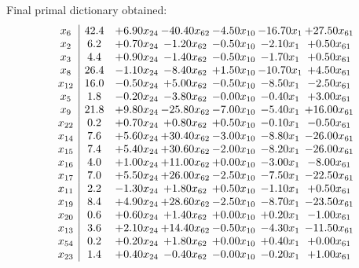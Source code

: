 \documentclass[8pt]{article}
\begin{document}
 Final primal dictionary obtained: 
\[\begin{array}{c| c c@{\hskip 2pt} c@{\hskip 2pt} c@{\hskip 2pt} c@{\hskip 2pt} c@{\hskip 2pt} }
 x_{6}   &  42.4 & +  6.90 x_{24} & -40.40 x_{62} & -4.50 x_{10} & -16.70 x_{1} & + 27.50 x_{61}\\
 x_{2}   &  6.2 & +  0.70 x_{24} & -1.20 x_{62} & -0.50 x_{10} & -2.10 x_{1} & +  0.50 x_{61}\\
 x_{3}   &  4.4 & +  0.90 x_{24} & -1.40 x_{62} & -0.50 x_{10} & -1.70 x_{1} & +  0.50 x_{61}\\
 x_{8}   &  26.4 & -1.10 x_{24} & -8.40 x_{62} & +  1.50 x_{10} & -10.70 x_{1} & +  4.50 x_{61}\\
 x_{12}   &  16.0 & -0.50 x_{24} & +  5.00 x_{62} & -0.50 x_{10} & -8.50 x_{1} & -2.50 x_{61}\\
 x_{5}   &  1.8 & -0.20 x_{24} & -3.80 x_{62} & -0.00 x_{10} & -0.40 x_{1} & +  3.00 x_{61}\\
 x_{9}   &  21.8 & +  9.80 x_{24} & -25.80 x_{62} & -7.00 x_{10} & -5.40 x_{1} & + 16.00 x_{61}\\
 x_{22}   &  0.2 & +  0.70 x_{24} & +  0.80 x_{62} & +  0.50 x_{10} & -0.10 x_{1} & -0.50 x_{61}\\
 x_{14}   &  7.6 & +  5.60 x_{24} & + 30.40 x_{62} & -3.00 x_{10} & -8.80 x_{1} & -26.00 x_{61}\\
 x_{15}   &  7.4 & +  5.40 x_{24} & + 30.60 x_{62} & -2.00 x_{10} & -8.20 x_{1} & -26.00 x_{61}\\
 x_{16}   &  4.0 & +  1.00 x_{24} & + 11.00 x_{62} & +  0.00 x_{10} & -3.00 x_{1} & -8.00 x_{61}\\
 x_{17}   &  7.0 & +  5.50 x_{24} & + 26.00 x_{62} & -2.50 x_{10} & -7.50 x_{1} & -22.50 x_{61}\\
 x_{11}   &  2.2 & -1.30 x_{24} & +  1.80 x_{62} & +  0.50 x_{10} & -1.10 x_{1} & +  0.50 x_{61}\\
 x_{19}   &  8.4 & +  4.90 x_{24} & + 28.60 x_{62} & -2.50 x_{10} & -8.70 x_{1} & -23.50 x_{61}\\
 x_{20}   &  0.6 & +  0.60 x_{24} & +  1.40 x_{62} & +  0.00 x_{10} & +  0.20 x_{1} & -1.00 x_{61}\\
 x_{13}   &  3.6 & +  2.10 x_{24} & + 14.40 x_{62} & -0.50 x_{10} & -4.30 x_{1} & -11.50 x_{61}\\
 x_{54}   &  0.2 & +  0.20 x_{24} & +  1.80 x_{62} & +  0.00 x_{10} & +  0.40 x_{1} & +  0.00 x_{61}\\
 x_{23}   &  1.4 & +  0.40 x_{24} & -0.40 x_{62} & -0.00 x_{10} & -0.20 x_{1} & +  1.00 x_{61}\\

\end{array}\]
\end{document}
